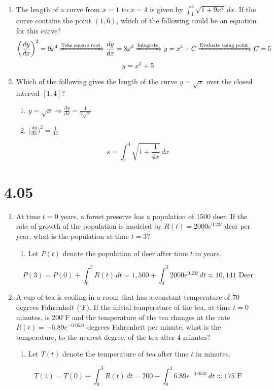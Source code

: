 \documentclass[12pt]{article}
\begin{document}
\begin{enumerate}
\begin{enumerate}
\begin{enumerate}
    \item Using Pythagoras to find arc length when $x\in[0,4) \Longrightarrow s_1 = \sqrt{(3)^2+(4)^2}= 5$
    \item Using the trivial action of counting when $x\in(12,14] \Longrightarrow s_3 = 2$
\end{enumerate}
$$\boxed{s = 7 + \int_{4}^{12} \sqrt{1+ \frac{(x-8)^2}{16}} \, dx }$$
        \item The length of a curve from $x=1$ to $x=4$ is given by $\int_{1}^{4}\sqrt{1+9x^4} \, dx$. If the curve contains the point $(1,6)$, which of the following could be an equation for this curve?
$$\biggr(\frac{dy}{dx}\biggr)^2 = 9x^4 \xRightarrow[]{\text{Take square root}} \frac{dy}{dx} = 3x^2 \xRightarrow[]{\text{Integrate}} y=x^3+C \xRightarrow[]{\text{Evaluate using point}} C=5$$
$$\boxed{y=x^3+5}$$

\item Which of the following gives the length of the curve $y=\sqrt{x}$ over the closed interval $[1,4]$?
        \begin{enumerate}
            \item $y=\sqrt{x} \Longrightarrow \frac{dy}{dx} = \frac{1}{2\sqrt{x}}$
            \item $\big(\frac{dy}{dx}\big)^2 = \frac{1}{4x}$
        \end{enumerate}
        $$\boxed{s= \int_{1}^{4} \sqrt{1+\frac{1}{4x}} \, dx}$$
\end{enumerate}
\section*{4.05}
\begin{enumerate}
    \item At time $t=0$ years, a forest preserve has a population of 1500 deer. If the rate of growth of the population is modeled by $R(t)=2000e^{0.23t}$ deer per year, what is the population at time $t=3$?
\begin{enumerate}
    \item Let $P(t)$ denote the population of deer after time $t$ in years.
\end{enumerate}
$$P(3)=P(0)+\int_{0}^{3} R(t) \, dt = 1,500 + \int_{0}^{3} 2000e^{0.23t} \, dt \approx \boxed{10,141\text{ Deer}}$$
    \item A cup of tea is cooling in a room that has a constant temperature of 70 degrees Fahrenheit ($^\circ$F). If the initial temperature of the tea, at time $t=0$ minutes, is 200$^\circ$F and the temperature of the tea changes at the rate $R(t)=-6.89e^{-0.053t}$ degrees Fahrenheit per minute, what is the temperature, to the nearest degree, of the tea after 4 minutes?
\begin{enumerate}
    \item Let $T(t)$ denote the temperature of tea after time $t$ in minutes.
\end{enumerate}
$$T(4)=T(0)+\int_{0}^{3} R(t) \, dt = 200 - \int_{0}^{4} 6.89e^{-0.053t} \, dt \approx \boxed{175^\circ\text{F}}$$


\end{enumerate}
\end{enumerate}
\end{document}
